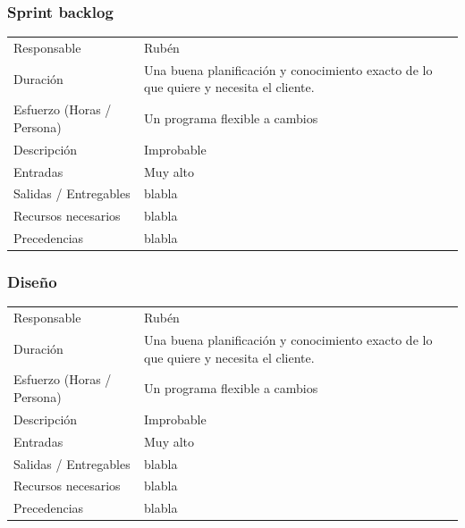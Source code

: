 \subsubsection{Sprint backlog}
\begin{table}[H]
    \begin{center}
        \begin{tabular}{l p{8cm}}
            Responsable                           & Rub\'{e}n \\
            Duraci\'{o}n                          & Una buena planificación y conocimiento exacto de lo que quiere y necesita el cliente. \\ 
            Esfuerzo (Horas / Persona)            & Un programa flexible a cambios \\
            Descripci\'{o}n                       & Improbable \\
            Entradas                              & Muy alto\\
            Salidas / Entregables                 & blabla \\
            Recursos necesarios                   & blabla \\
            Precedencias                          & blabla \\
        \end{tabular}
    \end{center}
    
\end{table}

\subsubsection{Dise\~{n}o}
\begin{table}[H]
    \begin{center}
        \begin{tabular}{l p{8cm}}
            Responsable                           & Rub\'{e}n \\
            Duraci\'{o}n                          & Una buena planificación y conocimiento exacto de lo que quiere y necesita el cliente. \\ 
            Esfuerzo (Horas / Persona)            & Un programa flexible a cambios \\
            Descripci\'{o}n                       & Improbable \\
            Entradas                              & Muy alto\\
            Salidas / Entregables                 & blabla \\
            Recursos necesarios                   & blabla \\
            Precedencias                          & blabla \\
        \end{tabular}
    \end{center}
    
\end{table}

